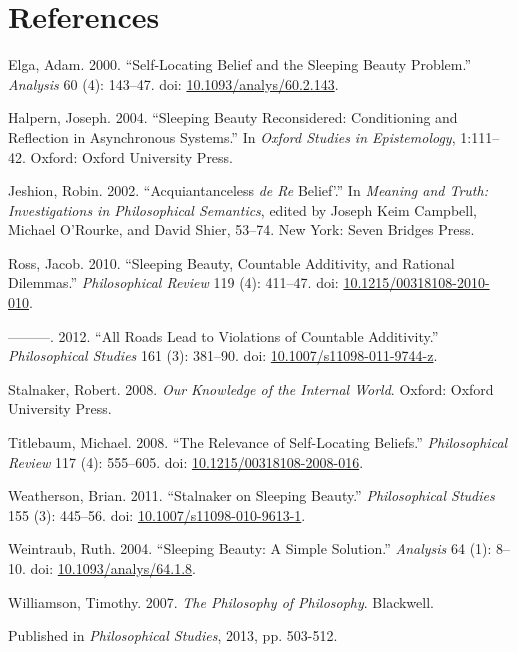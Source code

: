 \documentclass[
  11pt,
  letterpaper,
  DIV=11,
  numbers=noendperiod,
  twoside]{scrartcl}
\newlength{\cslhangindent}
\newenvironment{CSLReferences}[2] %
 {\begin{list}{}{%
  \setlength{\itemindent}{0pt}
  \setlength{\leftmargin}{0pt}
  \setlength{\parsep}{0pt}
  \ifodd #1
   \setlength{\leftmargin}{\cslhangindent}
   \setlength{\itemindent}{-1\cslhangindent}
  \fi
  \setlength{\itemsep}{#2\baselineskip}}}
 {\end{list}}
\begin{document}
\section*{References}\label{references}

\label{refs}
\begin{CSLReferences}{1}{0}
Elga, Adam. 2000. {``Self-Locating Belief and the Sleeping Beauty
Problem.''} \emph{Analysis} 60 (4): 143--47. doi:
\href{https://doi.org/10.1093/analys/60.2.143}{10.1093/analys/60.2.143}.

Halpern, Joseph. 2004. {``Sleeping Beauty Reconsidered: Conditioning and
Reflection in Asynchronous Systems.''} In \emph{Oxford Studies in
Epistemology}, 1:111--42. Oxford: Oxford University Press.

Jeshion, Robin. 2002. {``Acquiantanceless \emph{de Re} Belief'.''} In
\emph{Meaning and Truth: Investigations in Philosophical Semantics},
edited by Joseph Keim Campbell, Michael O'Rourke, and David Shier,
53--74. New York: Seven Bridges Press.

Ross, Jacob. 2010. {``Sleeping Beauty, Countable Additivity, and
Rational Dilemmas.''} \emph{Philosophical Review} 119 (4): 411--47. doi:
\href{https://doi.org/10.1215/00318108-2010-010}{10.1215/00318108-2010-010}.

---------. 2012. {``All Roads Lead to Violations of Countable
Additivity.''} \emph{Philosophical Studies} 161 (3): 381--90. doi:
\href{https://doi.org/10.1007/s11098-011-9744-z}{10.1007/s11098-011-9744-z}.

Stalnaker, Robert. 2008. \emph{Our Knowledge of the Internal World}.
Oxford: Oxford University Press.

Titlebaum, Michael. 2008. {``The Relevance of Self-Locating Beliefs.''}
\emph{Philosophical Review} 117 (4): 555--605. doi:
\href{https://doi.org/10.1215/00318108-2008-016}{10.1215/00318108-2008-016}.

Weatherson, Brian. 2011. {``Stalnaker on Sleeping Beauty.''}
\emph{Philosophical Studies} 155 (3): 445--56. doi:
\href{https://doi.org/10.1007/s11098-010-9613-1}{10.1007/s11098-010-9613-1}.

Weintraub, Ruth. 2004. {``Sleeping Beauty: A Simple Solution.''}
\emph{Analysis} 64 (1): 8--10. doi:
\href{https://doi.org/10.1093/analys/64.1.8}{10.1093/analys/64.1.8}.

Williamson, Timothy. 2007. \emph{{The Philosophy of Philosophy}}.
Blackwell.

\end{CSLReferences}



\noindent Published in\emph{
Philosophical Studies}, 2013, pp. 503-512.
\end{document}
